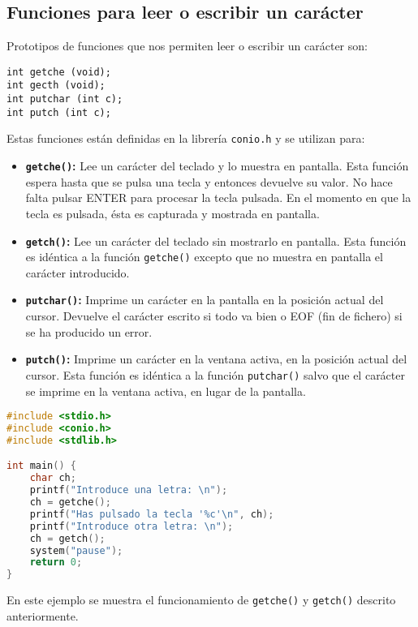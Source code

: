 \subsection{Funciones para leer o escribir un carácter}{
Prototipos de funciones que nos permiten leer o escribir un carácter son:

\texttt{int getche (void);}\\
\texttt{int gecth (void);}\\
\texttt{int putchar (int c);}\\
\texttt{int putch (int c);}

Estas funciones están definidas en la librería \texttt{conio.h} y se utilizan para:
\begin{itemize}
	\item \textbf{\texttt{getche()}:} Lee un carácter del teclado y lo muestra en pantalla. Esta función espera hasta que se pulsa una tecla y entonces devuelve su valor. No hace falta pulsar ENTER para procesar la tecla pulsada. En el momento en que la tecla es pulsada, ésta es capturada y mostrada en pantalla.
	\item \textbf{\texttt{getch()}:} Lee un carácter del teclado sin mostrarlo en pantalla. Esta función es idéntica a la función \texttt{getche()} excepto que no muestra en pantalla el carácter introducido.
	\item \textbf{\texttt{putchar()}:} Imprime un carácter en la pantalla en la posición actual del cursor. Devuelve el carácter escrito si todo va bien o EOF (fin de fichero) si se ha producido un error.
	\item \textbf{\texttt{putch()}:} Imprime un carácter en la ventana activa, en la posición actual del cursor. Esta función es idéntica a la función \texttt{putchar()} salvo que el carácter se imprime en la ventana activa, en lugar de la pantalla.
\end{itemize}
\begin{Ejemplo}
\begin{lstlisting}[language=C]
#include <stdio.h>
#include <conio.h>
#include <stdlib.h>

int main() {
    char ch;
    printf("Introduce una letra: \n");
    ch = getche();
    printf("Has pulsado la tecla '%c'\n", ch);
    printf("Introduce otra letra: \n");
    ch = getch();
    system("pause");
    return 0;
}
\end{lstlisting}
\Explicacion
En este ejemplo se muestra el funcionamiento de \texttt{getche()} y \texttt{getch()} descrito anteriormente.
\end{Ejemplo}
}
